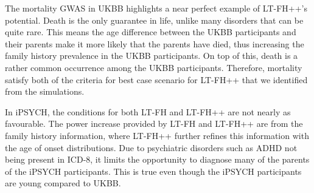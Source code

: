 The mortality GWAS in UKBB highlights a near perfect example of LT-FH++'s potential. Death is the only guarantee in life, unlike many disorders that can be quite rare. This means the age difference between the UKBB participants and their parents make it more likely that the parents have died, thus increasing the family history prevalence in the UKBB participants. On top of this, death is a rather common occurrence among the UKBB participants. Therefore, mortality satisfy both of the criteria for best case scenario for LT-FH++ that we identified from the simulations. 

In iPSYCH, the conditions for both LT-FH and LT-FH++ are not nearly as favourable. The power increase provided by LT-FH and LT-FH++ are from the family history information, where LT-FH++ further refines this information with the age of onset distributions. Due to psychiatric disorders such as ADHD not being present in ICD-8, it limits the opportunity to diagnose many of the parents of the iPSYCH participants. This is true even though the iPSYCH participants are young compared to UKBB.